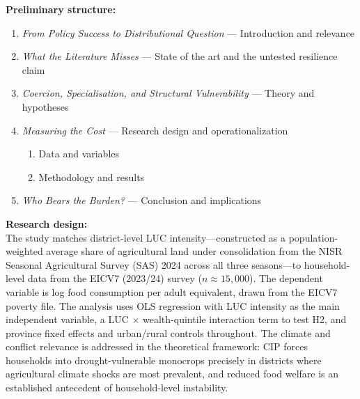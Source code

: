 \documentclass[11pt]{article}
\begin{document}
\vspace{0.4cm}

\noindent \textbf{Preliminary structure:}
\begin{enumerate}[noitemsep, topsep=2pt]
    \item \textit{From Policy Success to Distributional Question} ---
          Introduction and relevance
    \item \textit{What the Literature Misses} ---
          State of the art and the untested resilience claim
    \item \textit{Coercion, Specialisation, and Structural Vulnerability} ---
          Theory and hypotheses
    \item \textit{Measuring the Cost} --- Research design and operationalization
    \begin{enumerate}[label=4.\arabic*, noitemsep]
        \item Data and variables
        \item Methodology and results
    \end{enumerate}
    \item \textit{Who Bears the Burden?} --- Conclusion and implications
\end{enumerate}

\vspace{0.4cm}

\noindent \textbf{Research design:} \\

The study matches district-level LUC intensity---constructed as a
population-weighted average share of agricultural land under consolidation
from the NISR Seasonal Agricultural Survey (SAS) 2024 across all three
seasons---to household-level data from the EICV7 (2023/24) survey
($n \approx 15{,}000$). The dependent variable is log food consumption per
adult equivalent, drawn from the EICV7 poverty file. The analysis uses OLS
regression with LUC intensity as the main independent variable, a LUC
$\times$ wealth-quintile interaction term to test H2, and province fixed
effects and urban/rural controls throughout. The climate and conflict
relevance is addressed in the theoretical framework: CIP forces households
into drought-vulnerable monocrops precisely in districts where agricultural
climate shocks are most prevalent, and reduced food welfare is an established
antecedent of household-level instability.

\vspace{0.4cm}
\end{document}
